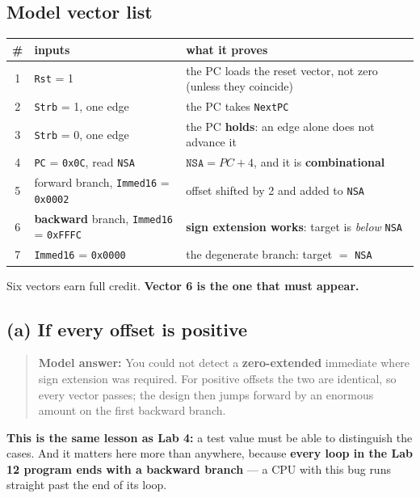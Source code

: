 \documentclass[11pt]{article}
\newcommand{\code}[1]{\texttt{#1}}
\begin{document}
\subsection*{Model vector list}

\begin{center}
\small
\begin{tabular}{c>{\raggedright\arraybackslash}p{5.2cm}>{\raggedright\arraybackslash}p{7.4cm}}
\toprule
\# & inputs & what it proves \\
\midrule
1 & \code{Rst} = 1 & the PC loads the reset vector, not zero (unless they coincide) \\
2 & \code{Strb} = 1, one edge & the PC takes \code{NextPC} \\
3 & \code{Strb} = 0, one edge & the PC \textbf{holds}: an edge alone does not advance it \\
4 & \code{PC} = \code{0x0C}, read \code{NSA} & $\code{NSA} = PC+4$, and it is \textbf{combinational} \\
5 & forward branch, \code{Immed16} = \code{0x0002} & offset shifted by 2 and added to \code{NSA} \\
6 & \textbf{backward} branch, \code{Immed16} = \code{0xFFFC} & \textbf{sign extension works}: target is \emph{below} \code{NSA} \\
7 & \code{Immed16} = \code{0x0000} & the degenerate branch: target $=$ \code{NSA} \\
\bottomrule
\end{tabular}
\end{center}

Six vectors earn full credit. \textbf{Vector 6 is the one that must appear.}

\subsection*{(a) If every offset is positive}

\begin{quote}
\textbf{Model answer:} You could not detect a \textbf{zero-extended} immediate
where sign extension was required. For positive offsets the two are identical, so
every vector passes; the design then jumps forward by an enormous amount on the
first backward branch.
\end{quote}

\textbf{This is the same lesson as Lab 4:} a test value must be able to
distinguish the cases. And it matters here more than anywhere, because
\textbf{every loop in the Lab 12 program ends with a backward branch} --- a CPU
with this bug runs straight past the end of its loop.
\end{document}
